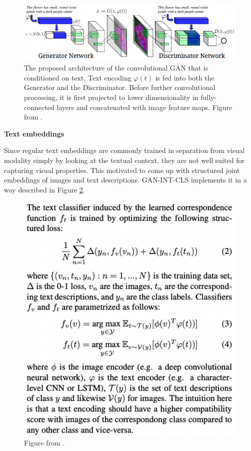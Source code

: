 \documentclass[
]{krantz}
\begin{document}
\begin{figure}

{\centering \includegraphics[width=0.8\linewidth]{figures/02-02-text-2-img/gancls} 

}

\caption{The proposed architecture of the convolutional GAN that is conditioned on text. Text encoding \(\varphi(t)\) is fed into both the Generator and the Discriminator. Before further convolutional processing, it is first projected to lower dimensionality in fully-connected layers and concatenated with image feature maps. Figure from \citet{GANTextToImage2016}.}\label{fig:gancls}
\end{figure}



\textbf{Text embeddings}

Since regular text embeddings are commonly trained in separation from visual modality simply by looking at the textual context, they are not well suited for capturing visual properties. This motivated \citet{JointRepresentations2016} to come up with structured joint embeddings of images and text descriptions. GAN-INT-CLS implements it in a way described in Figure \ref{fig:ganclsembeddings}.

\begin{figure}

{\centering \includegraphics[width=0.6\linewidth]{figures/02-02-text-2-img/ganclsembeddings} 

}

\caption{Figure from \citet{GANTextToImage2016}.}\label{fig:ganclsembeddings}
\end{figure}
\end{document}
